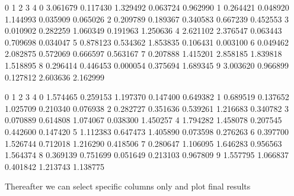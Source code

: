 \documentclass[letterpaper,10pt,english]{sphinxmanual}
\begin{document}
\begin{sphinxVerbatim}[commandchars=\\\{\}]
          0         1         2         3         4
0  3.061679  0.117430  1.329492  0.063724  0.962990
1  0.264421  0.048920  1.144993  0.035909  0.065026
2  0.209789  0.189367  0.340583  0.667239  0.452553
3  0.010902  0.282259  1.060349  0.191963  1.250636
4  2.621102  2.376547  0.063443  0.709698  0.034047
5  0.878123  0.534362  1.853835  0.106431  0.003100
6  0.049462  2.082875  0.572069  0.666597  0.563167
7  0.207888  1.415201  2.858185  1.839818  1.518895
8  0.296414  0.446453  0.000054  0.375694  1.689345
9  3.003620  0.966899  0.127812  2.603636  2.162999
\end{sphinxVerbatim}

\begin{sphinxVerbatim}[commandchars=\\\{\}]
          0         1         2         3         4
0 \PYGZhy{}1.574465  0.259153  1.197370  0.147400  0.649382
1  0.689519  0.137652 \PYGZhy{}1.025709  0.210340 \PYGZhy{}0.076938
2 \PYGZhy{}0.282727  0.351636 \PYGZhy{}0.539261  1.216683  0.340782
3  0.070889 \PYGZhy{}0.614808  1.074067 \PYGZhy{}0.038300 \PYGZhy{}1.450257
4  1.794282  1.458078 \PYGZhy{}0.207545 \PYGZhy{}0.442600 \PYGZhy{}0.147420
5  1.112383  0.647473  1.405890  0.073598 \PYGZhy{}0.276263
6  0.397700 \PYGZhy{}1.526744 \PYGZhy{}0.712018  1.216290  0.418506
7 \PYGZhy{}0.280647  1.106095 \PYGZhy{}1.646283 \PYGZhy{}0.956563 \PYGZhy{}1.564374
8 \PYGZhy{}0.369139 \PYGZhy{}0.751699  0.051649 \PYGZhy{}0.213103  0.967809
9 \PYGZhy{}1.557795 \PYGZhy{}1.066837  0.401842 \PYGZhy{}1.213743  1.138775
\end{sphinxVerbatim}

Thereafter we can select specific columns only and plot final results
\end{document}
